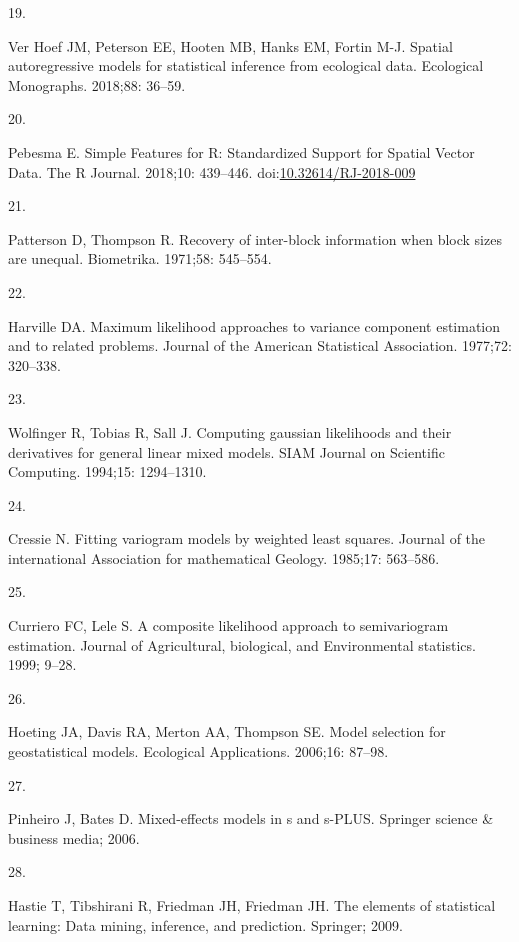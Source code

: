 \documentclass[10pt,letterpaper]{article}
\newlength{\cslhangindent}
\newlength{\csllabelwidth}
\newlength{\cslentryspacingunit} %
\newenvironment{CSLReferences}[2] %
 {%
  \setlength{\parindent}{0pt}
  \ifodd #1
  \let\oldpar\par
  \def\par{\hangindent=\cslhangindent\oldpar}
  \fi
  \setlength{\parskip}{#2\cslentryspacingunit}
 }%
 {}
\newcommand{\CSLLeftMargin}[1]{\parbox[t]{\csllabelwidth}{#1}}
\newcommand{\CSLRightInline}[1]{\parbox[t]{\linewidth - \csllabelwidth}{#1}\break}
\begin{document}
\begin{CSLReferences}{0}{0}
\leavevmode\hypertarget{ref-ver2018spatial}{}%
\CSLLeftMargin{19. }
\CSLRightInline{Ver Hoef JM, Peterson EE, Hooten MB, Hanks EM, Fortin
M-J. Spatial autoregressive models for statistical inference from
ecological data. Ecological Monographs. 2018;88: 36--59. }

\leavevmode\hypertarget{ref-pebesma2018sf}{}%
\CSLLeftMargin{20. }
\CSLRightInline{Pebesma E. {Simple Features for R: Standardized Support
for Spatial Vector Data}. {The R Journal}. 2018;10: 439--446.
doi:\href{https://doi.org/10.32614/RJ-2018-009}{10.32614/RJ-2018-009}}

\leavevmode\hypertarget{ref-patterson1971recovery}{}%
\CSLLeftMargin{21. }
\CSLRightInline{Patterson D, Thompson R. Recovery of inter-block
information when block sizes are unequal. Biometrika. 1971;58: 545--554.
}

\leavevmode\hypertarget{ref-harville1977maximum}{}%
\CSLLeftMargin{22. }
\CSLRightInline{Harville DA. Maximum likelihood approaches to variance
component estimation and to related problems. Journal of the American
Statistical Association. 1977;72: 320--338. }

\leavevmode\hypertarget{ref-wolfinger1994computing}{}%
\CSLLeftMargin{23. }
\CSLRightInline{Wolfinger R, Tobias R, Sall J. Computing gaussian
likelihoods and their derivatives for general linear mixed models. SIAM
Journal on Scientific Computing. 1994;15: 1294--1310. }

\leavevmode\hypertarget{ref-cressie1985fitting}{}%
\CSLLeftMargin{24. }
\CSLRightInline{Cressie N. Fitting variogram models by weighted least
squares. Journal of the international Association for mathematical
Geology. 1985;17: 563--586. }

\leavevmode\hypertarget{ref-curriero1999composite}{}%
\CSLLeftMargin{25. }
\CSLRightInline{Curriero FC, Lele S. A composite likelihood approach to
semivariogram estimation. Journal of Agricultural, biological, and
Environmental statistics. 1999; 9--28. }

\leavevmode\hypertarget{ref-hoeting2006model}{}%
\CSLLeftMargin{26. }
\CSLRightInline{Hoeting JA, Davis RA, Merton AA, Thompson SE. Model
selection for geostatistical models. Ecological Applications. 2006;16:
87--98. }

\leavevmode\hypertarget{ref-pinheiro2006mixed}{}%
\CSLLeftMargin{27. }
\CSLRightInline{Pinheiro J, Bates D. Mixed-effects models in s and
s-PLUS. Springer science \& business media; 2006. }

\leavevmode\hypertarget{ref-hastie2009elements}{}%
\CSLLeftMargin{28. }
\CSLRightInline{Hastie T, Tibshirani R, Friedman JH, Friedman JH. The
elements of statistical learning: Data mining, inference, and
prediction. Springer; 2009. }


\end{CSLReferences}
\end{document}
